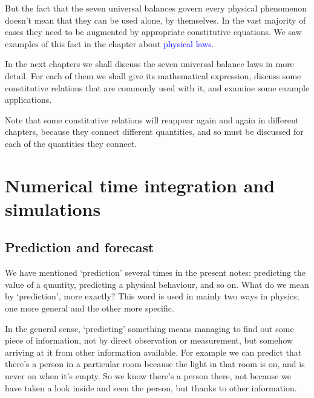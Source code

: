 \documentclass[a4paper,12pt,%
onecolumn,oneside,%
british%
]{memoir}
\renewcommand*{\|}[1][]{\nonscript\:#1\vert\nonscript\:\mathopen{}}
\newcommand*{\sect}{\S}%
\renewcommand*{\autoref}[2]{\sidepar{\vspace{-1ex}\footnotesize{\color{blue}\faIcon{%
angle-right%
}\enspace\sect~\ref{#1} page~\pageref{#1}}}\textcolor{blue}{#2}}
\begin{document}
\medskip


But the fact that the seven universal balances govern every physical phenomenon doesn't mean that they can be used alone, by themselves. In the vast majority of cases they need to be augmented by appropriate constitutive equations. We saw examples of this fact in the chapter about \autoref{cha:laws}{physical laws}.


\bigskip

In the next chapters we shall discuss the seven universal balance laws in more detail. For each of them we shall give its mathematical expression, discuss some constitutive relations that are commonly used with it, and examine some example applications.

Note that some constitutive relations will reappear again and again in different chapters, because they connect different quantities, and so must be discussed for each of the quantities they connect.



\section{Numerical time integration and simulations}
\label{sec:numeric_simulation}


\subsection{Prediction and forecast}
\label{sec:forecast}

We have mentioned \enquote*{prediction} several times in the present notes: predicting the value of a quantity, predicting a physical behaviour, and so on. What do we mean by \enquote*{prediction}, more exactly? This word is used in mainly two ways in physics; one more general and the other more specific.

In the general sense, \enquote*{predicting} something means managing to find out some piece of information, not by direct observation or measurement, but somehow arriving at it from other information available. For example we can predict that there's a person in a particular room because the light in that room is on, and is never on when it's empty. So we know there's a person there, not because we have taken a look inside and seen the person, but thanks to other information.
\end{document}
